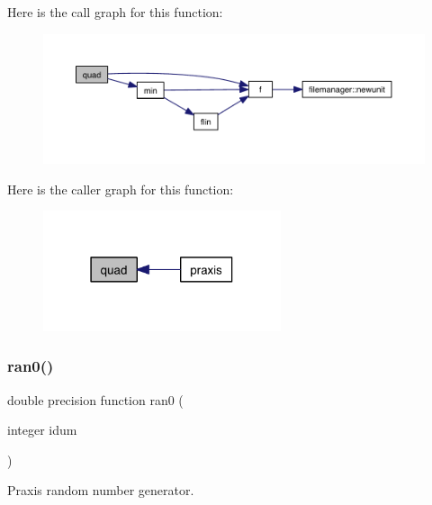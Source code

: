 Here is the call graph for this function\+:\nopagebreak
\begin{figure}[H]
\begin{center}
\leavevmode
\includegraphics[width=350pt]{praxis_8f_a0527d011f50eb026ac3ceea522e0ca5a_cgraph}
\end{center}
\end{figure}
Here is the caller graph for this function\+:\nopagebreak
\begin{figure}[H]
\begin{center}
\leavevmode
\includegraphics[width=198pt]{praxis_8f_a0527d011f50eb026ac3ceea522e0ca5a_icgraph}
\end{center}
\end{figure}
\mbox{\label{praxis_8f_af54b43bfee4d4da9d35c12de385dd6cd}} 
\subsubsection{\texorpdfstring{ran0()}{ran0()}}
{\footnotesize\ttfamily double precision function ran0 (\begin{DoxyParamCaption}\item[{integer}]{idum }\end{DoxyParamCaption})}



Praxis\textquotesingle{} random number generator. 


